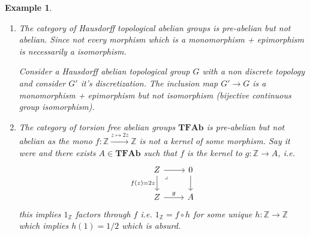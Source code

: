 \documentclass[12pt]{report}
\numberwithin{equation}{section}
\newcommand{\Z}{\mathbb{Z}}
\newtheorem{example}[dummy]{Example}
\begin{document}
	
	\begin{example}\label{expreabnotab}
		
		\begin{enumerate}Some non examples are:
			\item The category of Hausdorff topological abelian groups is pre-abelian but not abelian. Since not every morphism which is a monomorphism + epimorphism is necessarily a isomorphism. 
			
			Consider a Hausdorff abelian topological group $G$ with a non discrete topology and consider $G'$ it's discretization. The inclusion map $G' \to G$ is a monomorphism + epimorphism but not isomorphism (bijective continuous group isomorphism). 
			\item The category of torsion free abelian groups $\mathbf{TFAb}$ is pre-abelian but not abelian as the mono $f: \Z \xrightarrow{z\mapsto 2z} \Z $ is not a kernel of some morphism. Say it were and there exists $ A \in \mathbf{TFAb}$ such that $f$ is the kernel to $ g: \Z \to A$, i.e.
			\[\begin{tikzcd}
				Z & 0 \\
				Z & A
				\arrow[from=1-1, to=1-2]
				\arrow["{f(z)=2z}"', from=1-1, to=2-1]
				\arrow["\lrcorner"{anchor=center, pos=0.125}, draw=none, from=1-1, to=2-2]
				\arrow[from=1-2, to=2-2]
				\arrow["g", from=2-1, to=2-2]
			\end{tikzcd}\]
			this implies $1_\Z$ factors through $f$ i.e. $1_\Z =f\circ h$ for some unique $h:\Z \to \Z $ which implies $h(1)=1/2$ which is absurd.
		\end{enumerate}
		
	\end{example}
\end{document}
